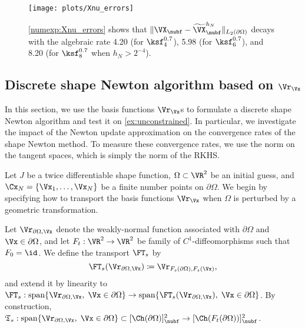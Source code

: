 \documentclass{siamart1116}
\numberwithin{theorem}{section}
\begin{document}
\begin{figure}[htb!]
\centering
\texttt{[image: plots/Xnu\_errors]}
\caption{
\cref{numexp:Xnu_errors} shows that
$\Vert \VX_{\nubf} - \widetilde\VX_{\nubf}^{h_N}\Vert_{L_2(\partial\Omega)}$
decays with the algebraic rate 4.20 (for $\ksf_4^{0.7}$), 5.98 (for $\ksf_6^{0.7}$),
and 8.20 (for $\ksf_8^{0.7}$ when $h_N>2^{-4}$).}
\label{fig:Xnu_errors}
\end{figure}

\subsection{Discrete shape Newton algorithm based on $\Vr_\Vx$}
In this section, we use the basis functions $\Vr_\Vx$s to formulate a discrete
shape Newton algorithm and test it on \cref{ex:unconstrained}.
In particular, we investigate the impact of the Newton update approximation
on the convergence rates of the shape Newton method.
To measure these convergence rates, we use the norm on the tangent spaces,
which is simply the norm of the RKHS.

Let $J$ be a twice differentiable shape function,
$\Omega\subset \VR^2$ be an initial guess, and $\Cx_N=\{\Vx_1,\ldots, \Vx_N\}$ be a
finite number points on $\partial\Omega$.
We begin by specifying how to transport the basis functions $\Vr_\Vx$
when $\Omega$ is perturbed by a geometric transformation.

\begin{definition}
Let $\Vr_{\partial \Omega,\Vx}$ denote the weakly-normal function associated with 
$\partial \Omega $ and $\Vx\in \partial \Omega$,
and let $F_t:\VR^2\to \VR^2$ be family of $C^1$-diffeomorphisms
such that $F_0=\id$. We define the transport $\FT_s$ by
\begin{equation}
\FT_s(\Vr_{\partial \Omega,\Vx}) \coloneqq \Vr_{F_s(\partial \Omega),F_s(\Vx)},
\end{equation}
and extend it by linearity to
$\mathfrak \FT_s:\mathrm{span}\{\Vr_{\partial \Omega,\Vx},\; \Vx\in \partial \Omega\} \to
\mathrm{span}\{\FT_s(\Vr_{\partial \Omega,\Vx}),\; \Vx\in \partial \Omega\}$.
By construction, $\mathfrak T_s:\mathrm{span}\{\Vr_{\partial \Omega,\Vx},\; \Vx\in \partial \Omega\}\subset [\Ch(\partial \Omega)]_{\nubf}^2 \to [\Ch(F_t(\partial \Omega))]_{\nubf}^2$. 
\end{definition}
\end{document}
